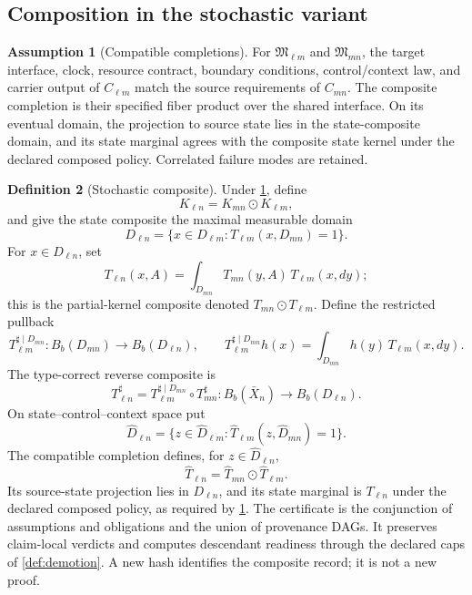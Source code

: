 \documentclass[11pt,a4paper]{article}
\theoremstyle{definition}
\newtheorem{definition}{Definition}[section]
\newtheorem{assumption}[definition]{Assumption}
\theoremstyle{plain}
\theoremstyle{remark}
\begin{document}
\subsection{Composition in the stochastic variant}

\begin{assumption}[Compatible completions]\label{ass:completion}
For \(\mathfrak M_{\ell m}\) and \(\mathfrak M_{mn}\), the target interface,
clock, resource contract, boundary conditions, control/context law, and
carrier output of \(C_{\ell m}\) match the source requirements of \(C_{mn}\).
The composite completion is their specified fiber product over the shared
interface.  On its eventual domain, the projection to source state lies in
the state-composite domain, and its state marginal agrees with the composite
state kernel under the declared composed policy.  Correlated failure modes
are retained.
\end{assumption}

\begin{definition}[Stochastic composite]\label{def:stochcomp}
Under \cref{ass:completion}, define
\[
K_{\ell n}=K_{mn}\odot K_{\ell m},
\]
and give the state composite the maximal measurable domain
\[
D_{\ell n}
=\{x\in D_{\ell m}:T_{\ell m}(x,D_{mn})=1\}.
\]
For \(x\in D_{\ell n}\), set
\[
T_{\ell n}(x,A)
=\int_{D_{mn}}T_{mn}(y,A)\,T_{\ell m}(x,dy);
\]
this is the partial-kernel composite denoted
\(T_{mn}\odot T_{\ell m}\).  Define the restricted pullback
\[
T_{\ell m}^{\sharp\mid D_{mn}}:
B_b(D_{mn})\longrightarrow B_b(D_{\ell n}),\qquad
T_{\ell m}^{\sharp\mid D_{mn}}h(x)
=\int_{D_{mn}}h(y)\,T_{\ell m}(x,dy).
\]
The type-correct reverse composite is
\[
T_{\ell n}^{\sharp}
=T_{\ell m}^{\sharp\mid D_{mn}}\circ T_{mn}^{\sharp}:
B_b(\bar X_n)\longrightarrow B_b(D_{\ell n}).
\]
On state--control--context space put
\[
\widehat D_{\ell n}
=\{z\in\widehat D_{\ell m}:
\widehat T_{\ell m}(z,\widehat D_{mn})=1\}.
\]
The compatible completion defines, for \(z\in\widehat D_{\ell n}\),
\[
\widehat T_{\ell n}
=\widehat T_{mn}\odot\widehat T_{\ell m}.
\]
Its source-state projection lies in \(D_{\ell n}\), and its state marginal is
\(T_{\ell n}\) under the declared composed policy, as required by
\cref{ass:completion}.  The certificate is the conjunction of assumptions and
obligations and the union of provenance DAGs.  It preserves claim-local
verdicts and computes descendant readiness through the declared caps of
\cref{def:demotion}.
A new hash identifies the composite record; it is not a new proof.
\end{definition}
\end{document}
